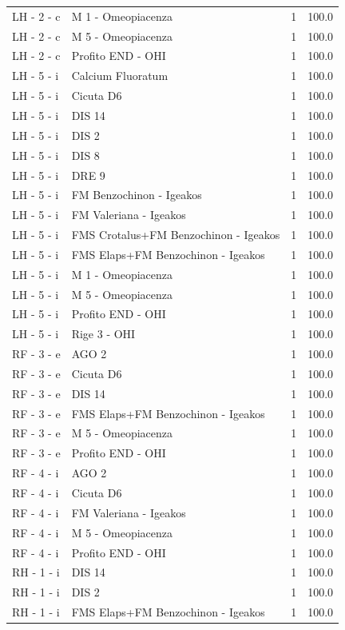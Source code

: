 \documentclass[a4paper,11pt]{article}
\begin{document}
\begin{footnotesize}
\begin{longtable}{p{3.5cm}p{7.5cm}rr}
LH - 2 - c & M 1 - Omeopiacenza & 1 & 100.0 \\
LH - 2 - c & M 5 - Omeopiacenza & 1 & 100.0 \\
LH - 2 - c & Profito END - OHI & 1 & 100.0 \\
LH - 5 - i & Calcium Fluoratum & 1 & 100.0 \\
LH - 5 - i & Cicuta D6 & 1 & 100.0 \\
LH - 5 - i & DIS 14 & 1 & 100.0 \\
LH - 5 - i & DIS 2 & 1 & 100.0 \\
LH - 5 - i & DIS 8 & 1 & 100.0 \\
LH - 5 - i & DRE 9 & 1 & 100.0 \\
LH - 5 - i & FM Benzochinon - Igeakos & 1 & 100.0 \\
LH - 5 - i & FM Valeriana - Igeakos & 1 & 100.0 \\
LH - 5 - i & FMS Crotalus+FM Benzochinon - Igeakos & 1 & 100.0 \\
LH - 5 - i & FMS Elaps+FM Benzochinon - Igeakos & 1 & 100.0 \\
LH - 5 - i & M 1 - Omeopiacenza & 1 & 100.0 \\
LH - 5 - i & M 5 - Omeopiacenza & 1 & 100.0 \\
LH - 5 - i & Profito END - OHI & 1 & 100.0 \\
LH - 5 - i & Rige 3 - OHI & 1 & 100.0 \\
RF - 3 - e & AGO 2 & 1 & 100.0 \\
RF - 3 - e & Cicuta D6 & 1 & 100.0 \\
RF - 3 - e & DIS 14 & 1 & 100.0 \\
RF - 3 - e & FMS Elaps+FM Benzochinon - Igeakos & 1 & 100.0 \\
RF - 3 - e & M 5 - Omeopiacenza & 1 & 100.0 \\
RF - 3 - e & Profito END - OHI & 1 & 100.0 \\
RF - 4 - i & AGO 2 & 1 & 100.0 \\
RF - 4 - i & Cicuta D6 & 1 & 100.0 \\
RF - 4 - i & FM Valeriana - Igeakos & 1 & 100.0 \\
RF - 4 - i & M 5 - Omeopiacenza & 1 & 100.0 \\
RF - 4 - i & Profito END - OHI & 1 & 100.0 \\
RH - 1 - i & DIS 14 & 1 & 100.0 \\
RH - 1 - i & DIS 2 & 1 & 100.0 \\
RH - 1 - i & FMS Elaps+FM Benzochinon - Igeakos & 1 & 100.0 \\

\end{longtable}
\end{footnotesize}
\end{document}
